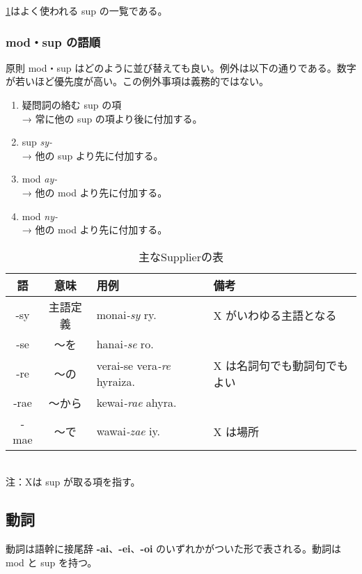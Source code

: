 \cref{table:common-sups}はよく使われる sup の一覧である。

\subsubsection{mod・sup の語順}

原則 mod・sup はどのように並び替えても良い。例外は以下の通りである。数字が若いほど優先度が高い。この例外事項は義務的ではない。

\begin{enumerate}
    \item 疑問詞の絡む sup の項 \\ → 常に他の sup の項より後に付加する。
    \item sup \emph{sy-} \\ → 他の sup より先に付加する。
    \item mod \emph{ay-} \\ → 他の mod より先に付加する。
    \item mod \emph{ny-} \\ → 他の mod より先に付加する。
\end{enumerate}

\begin{table}[h]
    \centering
    \caption{主なSupplierの表}
    \label{table:common-sups}
    \begin{tabular}{ccll}
        \hline
        語 & 意味 & 用例 & 備考 \\
        \hline \hline
        -sy  & 主語定義 & monai\emph{-sy} ry.             & X がいわゆる主語となる \\
        -se  & ～を & hanai\emph{-se} ro.                 & \\
        -re  & ～の & verai-se vera\emph{-re} hyraiza.   & X は名詞句でも動詞句でもよい \\
        -rae & ～から & kewai\emph{-rae} ahyra.            & \\
        -mae & ～で & wawai\emph{-zae} iy.                 & X は場所 \\
        \hline
    \end{tabular}
    \\ 注：Xは sup が取る項を指す。
\end{table}

\subsection{動詞}

動詞は語幹に接尾辞 \textbf{-ai}、\textbf{-ei}、\textbf{-oi} のいずれかがついた形で表される。動詞は mod と sup を持つ。


